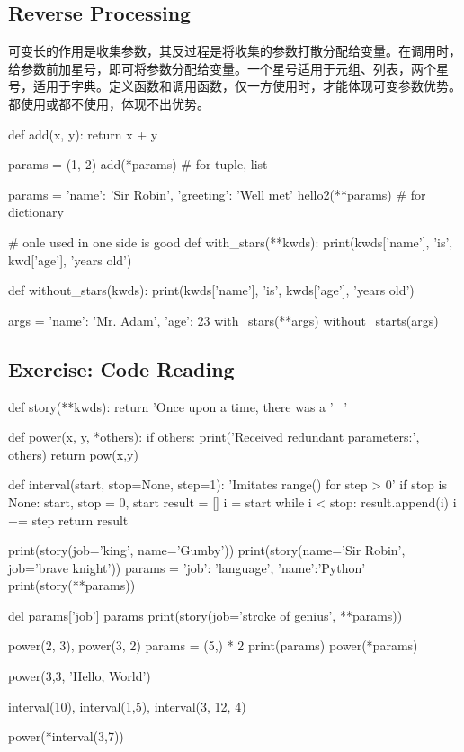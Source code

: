 \subsection{Reverse Processing}
可变长的作用是收集参数，其反过程是将收集的参数打散分配给变量。在调用时，给参数前加星号，即可将参数分配给变量。一个星号适用于元组、列表，两个星号，适用于字典。定义函数和调用函数，仅一方使用时，才能体现可变参数优势。都使用或都不使用，体现不出优势。
\begin{python}
def add(x, y):
    return x + y

params = (1, 2)
add(*params)  #  for tuple, list

params = {'name': 'Sir Robin', 'greeting': 'Well met'}
hello2(**params)  # for dictionary

# onle used in one side is good
def with_stars(**kwds):
    print(kwds['name'], 'is', kwd['age'], 'years old')

def without_stars(kwds):
    print(kwds['name'], 'is', kwds['age'], 'years old')

args = {'name': 'Mr. Adam', 'age': 23}
with_stars(**args)
without_starts(args)
\end{python}
\subsection{Exercise: Code Reading}
\begin{python}
def story(**kwds):
    return 'Once upon a time, there was a ' \
    '%

def power(x, y, *others):
    if others:
        print('Received redundant parameters:', others)
    return pow(x,y)

def interval(start, stop=None, step=1):
    'Imitates range() for step > 0'
    if stop is None:
        start, stop = 0, start
    result = []
    i = start
    while i < stop:
        result.append(i)
        i += step
    return result

print(story(job='king', name='Gumby'))
print(story(name='Sir Robin', job='brave knight'))
params = {'job': 'language', 'name':'Python'}
print(story(**params))

del params['job']
params
print(story(job='stroke of genius', **params))


power(2, 3), power(3, 2)
params = (5,) * 2
print(params)
power(*params)

power(3,3, 'Hello, World')

interval(10), interval(1,5), interval(3, 12, 4)

power(*interval(3,7))
\end{python}

